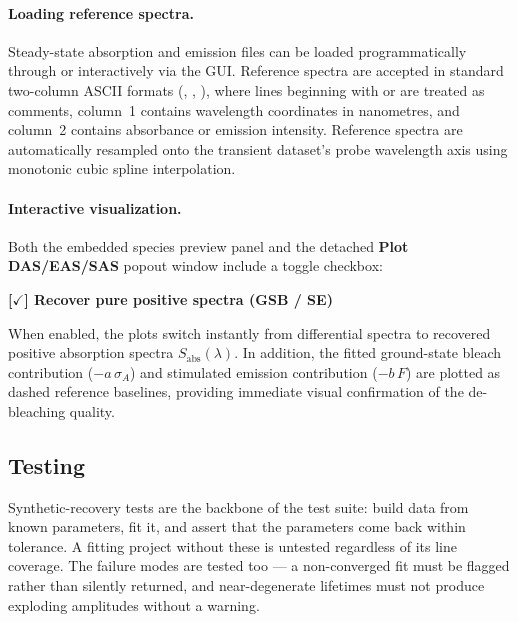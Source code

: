 \paragraph{Loading reference spectra.}
Steady-state absorption and emission files can be loaded programmatically through  or interactively via the GUI. Reference spectra are accepted in standard two-column ASCII formats (, , ), where lines beginning with \code{\#} or \code{\%} are treated as comments, column~1 contains wavelength coordinates in nanometres, and column~2 contains absorbance or emission intensity. Reference spectra are automatically resampled onto the transient dataset's probe wavelength axis using monotonic cubic spline interpolation.

\paragraph{Interactive visualization.}
Both the embedded species preview panel and the detached \textbf{Plot DAS/EAS/SAS} popout window include a toggle checkbox:
\begin{center}
  \textbf{[$\checkmark$] Recover pure positive spectra (GSB / SE)}
\end{center}
When enabled, the plots switch instantly from differential spectra to recovered positive absorption spectra $S_{\mathrm{abs}}(\lambda)$. In addition, the fitted ground-state bleach contribution ($-a\,\sigma_A$) and stimulated emission contribution ($-b\,F$) are plotted as dashed reference baselines, providing immediate visual confirmation of the de-bleaching quality.

\subsection{Testing}

Synthetic-recovery tests are the backbone of the test suite: build data from
known parameters, fit it, and assert that the parameters come back within
tolerance. A fitting project without these is untested regardless of its line
coverage. The failure modes are tested too --- a non-converged fit must be
flagged rather than silently returned, and near-degenerate lifetimes must not
produce exploding amplitudes without a warning.

